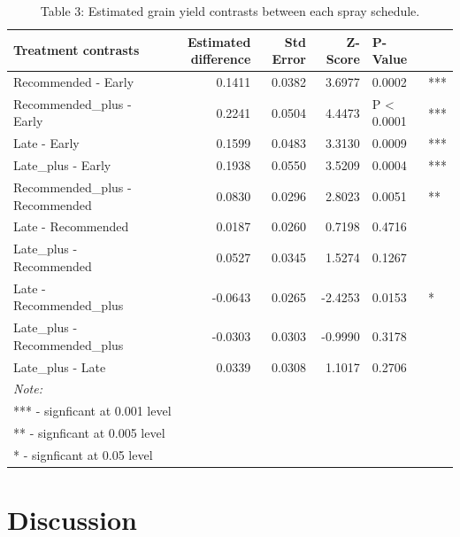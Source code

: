 \documentclass[agronomy,article,submit,moreauthors,pdftex]{mdpi}
\begin{document}
\begin{table}

\caption{\label{tab:Table3}Table 3: Estimated grain yield contrasts between each spray schedule.}
\centering
\begin{tabular}[t]{lrrrll}
\toprule
Treatment contrasts & Estimated difference & Std Error & Z-Score & P-Value &  \\
\midrule
Recommended - Early & 0.1411 & 0.0382 & 3.6977 & 0.0002 & ***\\
Recommended\_plus - Early & 0.2241 & 0.0504 & 4.4473 & P < 0.0001 & ***\\
Late - Early & 0.1599 & 0.0483 & 3.3130 & 0.0009 & ***\\
Late\_plus - Early & 0.1938 & 0.0550 & 3.5209 & 0.0004 & ***\\
Recommended\_plus - Recommended & 0.0830 & 0.0296 & 2.8023 & 0.0051 & **\\
\addlinespace
Late - Recommended & 0.0187 & 0.0260 & 0.7198 & 0.4716 & \\
Late\_plus - Recommended & 0.0527 & 0.0345 & 1.5274 & 0.1267 & \\
Late - Recommended\_plus & -0.0643 & 0.0265 & -2.4253 & 0.0153 & *\\
Late\_plus - Recommended\_plus & -0.0303 & 0.0303 & -0.9990 & 0.3178 & \\
Late\_plus - Late & 0.0339 & 0.0308 & 1.1017 & 0.2706 & \\
\bottomrule
\multicolumn{6}{l}{\textit{Note: }}\\
\multicolumn{6}{l}{*** - signficant at 0.001 level}\\
\multicolumn{6}{l}{** - signficant at 0.005 level}\\
\multicolumn{6}{l}{* - signficant at 0.05 level}\\
\end{tabular}
\end{table}

\hypertarget{discussion}{%
\section{Discussion}\label{discussion}}
\end{document}
